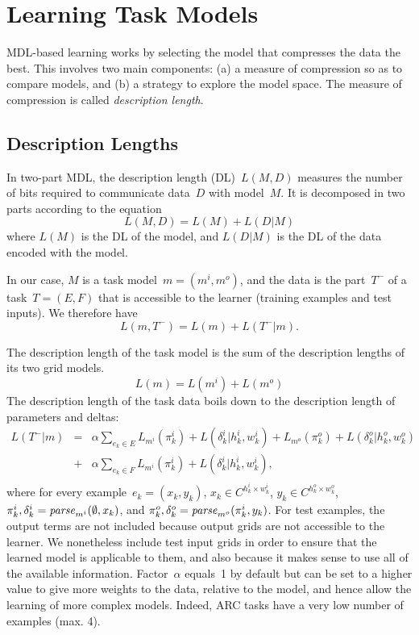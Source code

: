 \documentclass[a4paper]{llncs}
\begin{document}
\section{Learning Task Models}
\label{learning}

MDL-based learning works by selecting the model that compresses the
data the best. This involves two main components: (a) a measure of
compression so as to compare models, and (b) a strategy to explore the
model space. The measure of compression is called {\em description
  length}.

\subsection{Description Lengths}
\label{dl}

In two-part MDL, the description length (DL)~$L(M,D)$ measures the number
of bits required to communicate data~$D$ with model~$M$. It is
decomposed in two parts according to the equation
\[ L(M,D) = L(M) + L(D|M) \] where $L(M)$ is the DL of the model, and
$L(D|M)$ is the DL of the data encoded with the model.

In our case, $M$ is a task model~$m = (m^i,m^o)$, and the data is the
part~$T^-$ of a task~$T = (E,F)$ that is accessible to the learner
(training examples and test inputs). We therefore have
\[ L(m,T^-) = L(m) + L(T^-|m). \]

The description length of the task model is the sum of the description
lengths of its two grid models.
\[ L(m) = L(m^i) + L(m^o) \] 
%
The description length of the task data boils down to the description
length of parameters and deltas:
\[\begin{array}{lcl}
L(T^-|m) & = & \alpha \sum_{e_k \in E} L_{m^i}(\pi^i_k) + L(\delta^i_k|h^i_k,w^i_k) + L_{m^o}(\pi^o_k) + L(\delta^o_k|h^o_k,w^o_k) \\
& + & \alpha \sum_{e_k \in F} L_{m^i}(\pi^i_k) + L(\delta^i_k|h^i_k,w^i_k), \\
  \end{array} \]
%
where for every example~$e_k = (x_k,y_k)$,
$x_k \in C^{h^i_k \times w^i_k}$, $y_k \in C^{h^o_k \times w^o_k}$,
$\pi^i_k, \delta^i_k = {\it parse}_{m^i}(\emptyset,x_k)$, and
$\pi^o_k, \delta^o_k = {\it parse}_{m^o}(\pi^i_k,y_k)$. For test
examples, the output terms are not included because output grids are
not accessible to the learner. We nonetheless include test input grids
in order to ensure that the learned model is applicable to them, and
also because it makes sense to use all of the available information.
%
Factor~$\alpha$ equals~1 by default but can be set to a higher value
to give more weights to the data, relative to the model, and hence
allow the learning of more complex models. Indeed, ARC tasks have a
very low number of examples (max. 4).
\end{document}
